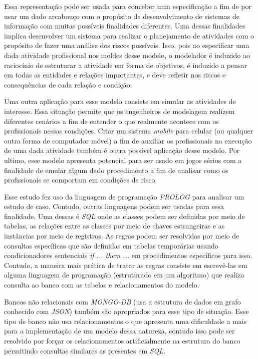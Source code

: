 Essa representação pode ser usada para conceber uma especificação a fim de por usar um dado arcabouço com o propósito de  desenvolvimento de sistemas de informação com muitas possíveis finalidades diferentes. Uma dessas finalidades implica desenvolver um sistema para realizar o planejamento de atividades com o propósito de fazer uma análise dos riscos possíveis. Isso, pois ao especificar uma dada atividade profissional nos moldes desse modelo, o modelador é induzido ao raciocínio de estruturar a atividade em forma de objetivos, é induzido a pensar em todas as entidades e relações importantes, e deve refletir nos riscos e consequências de cada relação e condição. 

Uma outra aplicação para esse modelo consiste em simular as atividades de interesse. 
Essa situação permite que os engenheiros de modelagem realizem diferentes cenários a fim de entender o que realmente acontece com os profissionais nessas condições. Criar um sistema \textit{mobile} para celular (ou qualquer outra forma de computador móvel) a fim de auxiliar os profissionais na execução de uma dada atividade também é outra possível aplicação desse modelo. Por ultimo, esse modelo apresenta potencial para ser usado em jogos sérios com a finalidade de emular algum dado procedimento a fim 
de analisar como os profissionais se comportam em condições de risco. 

Esse estudo fez uso da linguagem de programação \textit{PROLOG} para analisar um estudo de caso. Contudo, outras linguagens podem ser usadas para essa finalidade. Uma dessas é \textit{SQL} onde as classes podem ser definidas por meio de tabelas, as relações entre as classes por meio de chaves estrangeiras e as instâncias por meio de registros. As regras podem ser resolvidas por meio de consultas específicas que são definidas em tabelas temporárias usando condicionadores sentenciais \textit{if ... them ...} em procedimentos específicos para isso. Contudo, a maneira mais prática de tratar as regras consiste em escrevê-las em alguma linguagem de programação (estruturado em um algoritmo) que realiza consulta ao banco com as tabelas e relacionamentos do modelo. 

Bancos não relacionais com \textit{MONGO-DB} (usa a estrutura de dados em grafo conhecido com \textit{JSON}) também são apropriados para esse tipo de situação. Esse tipo 
de banco não usa relacionamentos o que apresenta uma dificuldade a mais para a implementação de um modelo dessa natureza, contudo isso pode ser resolvido por forçar os relacionamentos artificialmente na estrutura do banco permitindo consultas similares as presentes em \textit{SQL}.

